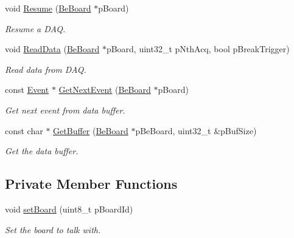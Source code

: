 \begin{CompactItemize}
void \hyperlink{class_ph2___hw_interface_1_1_be_board_interface_d21d2651379571889a7a2ebc55ee3223}{Resume} (\hyperlink{class_ph2___hw_description_1_1_be_board}{Be\-Board} $\ast$p\-Board)
\begin{CompactList}\small\item\em Resume a DAQ. \item\end{CompactList}\item 
void \hyperlink{class_ph2___hw_interface_1_1_be_board_interface_3e5106285fa795c21cb9d20fbf753759}{Read\-Data} (\hyperlink{class_ph2___hw_description_1_1_be_board}{Be\-Board} $\ast$p\-Board, uint32\_\-t p\-Nth\-Acq, bool p\-Break\-Trigger)
\begin{CompactList}\small\item\em Read data from DAQ. \item\end{CompactList}\item 
const \hyperlink{class_ph2___hw_interface_1_1_event}{Event} $\ast$ \hyperlink{class_ph2___hw_interface_1_1_be_board_interface_8dadf0d6aba310d1476b5c50aae98742}{Get\-Next\-Event} (\hyperlink{class_ph2___hw_description_1_1_be_board}{Be\-Board} $\ast$p\-Board)
\begin{CompactList}\small\item\em Get next event from data buffer. \item\end{CompactList}\item 
const char $\ast$ \hyperlink{class_ph2___hw_interface_1_1_be_board_interface_09475ae1eaaf7a7ca50c5b426c93152f}{Get\-Buffer} (\hyperlink{class_ph2___hw_description_1_1_be_board}{Be\-Board} $\ast$p\-Be\-Board, uint32\_\-t \&p\-Buf\-Size)
\begin{CompactList}\small\item\em Get the data buffer. \item\end{CompactList}\end{CompactItemize}
\subsection*{Private Member Functions}
\begin{CompactItemize}
\item 
void \hyperlink{class_ph2___hw_interface_1_1_be_board_interface_c4f6fae0f69208acc832437359993665}{set\-Board} (uint8\_\-t p\-Board\-Id)
\begin{CompactList}\small\item\em Set the board to talk with. \item\end{CompactList}\end{CompactItemize}
